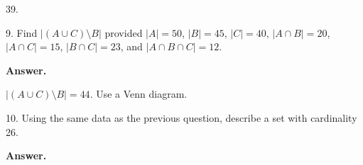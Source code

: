 \documentclass[10pt,]{book}
\theoremstyle{plain}
\theoremstyle{definition}
\theoremstyle{definition}
\theoremstyle{definition}
\numberwithin{equation}{section}
\begin{document}
\begin{exerciselist}
39.
%
\item[9.]\hypertarget{exercise-9}{}
Find \(|(A \cup C)\setminus B|\) provided \(|A| = 50\), \(|B| = 45\), \(|C| = 40\), \(|A\cap B| = 20\), \(|A \cap C| = 15\), \(|B \cap C| = 23\), and \(|A \cap B \cap C| = 12\).
%
\par\smallskip
\par\smallskip
\noindent\textbf{Answer.}\hypertarget{answer-9}{}\quad

\(|(A \cup C)\setminus B| = 44\). Use a Venn diagram.
%
\item[10.]\hypertarget{exercise-10}{}
Using the same data as the previous question, describe a set with cardinality 26.
%
\par\smallskip
\par\smallskip
\noindent\textbf{Answer.}\hypertarget{answer-10}{}\quad


\end{exerciselist}
\end{document}
